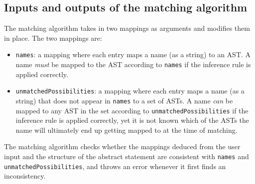 \subsection{Inputs and outputs of the matching algorithm}
The matching algorithm takes in two mappings as arguments and modifies them in place. The two mappings are:
\begin{itemize}
    \item \lstinline{names}: a mapping where each entry maps a name (as a string) to an AST. A name \textit{must} be mapped to the AST according to \lstinline{names} if the inference rule is applied correctly.
    \item \lstinline{unmatchedPossibilities}: a mapping where each entry maps a name (as a string) that does not appear in \lstinline{names} to a set of ASTs. A name \textit{can} be mapped to any AST in the set according to \lstinline{unmatchedPossibilities} if the inference rule is applied correctly, yet it is not known which of the ASTs the name will ultimately end up getting mapped to at the time of matching.
\end{itemize}
The matching algorithm checks whether the mappings deduced from the user input and the structure of the abstract statement are consistent with \lstinline{names} and \lstinline{unmatchedPossibilities}, and throws an error whenever it first finds an inconsistency.

